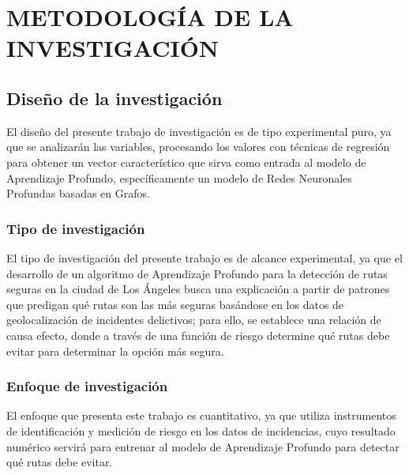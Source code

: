 \chapter{METODOLOGÍA DE LA INVESTIGACIÓN}
\section{Diseño de la investigación}
El diseño del presente trabajo de investigación es de tipo experimental puro, ya que se analizarán las variables, procesando los valores con técnicas de regresión para obtener un vector característico que sirva como entrada al modelo de Aprendizaje Profundo, específicamente un modelo de Redes Neuronales Profundas basadas en Grafos.
\subsection{Tipo de investigación}
El tipo de investigación del presente trabajo es de alcance experimental, ya que el desarrollo de un algoritmo de Aprendizaje Profundo para la detección de rutas seguras en la ciudad de Los Ángeles busca una explicación a partir de patrones que predigan qué rutas son las más seguras basándose en los datos de geolocalización de incidentes delictivos; para ello, se establece una relación de causa efecto, donde a través de una función de riesgo determine qué rutas debe evitar para determinar la opción más segura.


\subsection{Enfoque de investigación}
El enfoque que presenta este trabajo es cuantitativo, ya que utiliza instrumentos de identificación y medición de riesgo en los datos de incidencias, cuyo resultado numérico servirá para entrenar al modelo de Aprendizaje Profundo para detectar qué rutas debe evitar.

